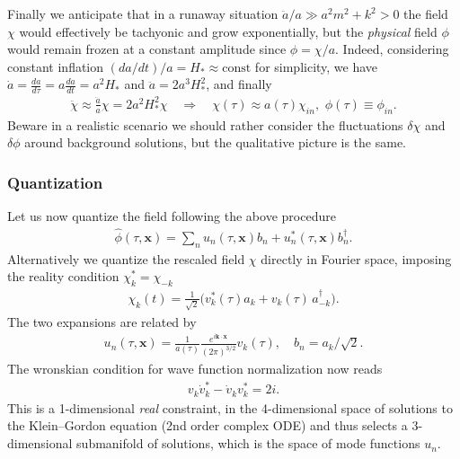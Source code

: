 \documentclass[../QFT_main.tex]{subfiles}
\begin{document}
Finally we anticipate that in a runaway situation $\ddot{a}/a\gg a^2m^2+k^2>0$ the field $\chi$ would effectively be tachyonic and grow exponentially, but the \emph{physical} field $\phi$ would remain frozen at a constant amplitude since $\phi=\chi/a$.
Indeed, considering constant inflation $(da/dt)/a=H_*\approx\mathrm{const}$ for simplicity, we have $\dot{a}=\frac{da}{d\tau}=a \frac{da}{dt}=a^2H_*$ and $\ddot{a} = 2 a^3 H_*^2$, and finally
\begin{align}
    \ddot{\chi} \approx \frac{\ddot{a}}{a}\chi = 2 a^2 H_*^2 \chi \quad \Rightarrow \quad \chi(\tau) \approx a(\tau)\chi_{in}, \,\, \phi(\tau)\equiv \phi_{in}.
\end{align}
Beware in a realistic scenario we should rather consider the fluctuations $\delta\chi$ and $\delta\phi$ around background solutions, but the qualitative picture is the same.



\subsubsection*{Quantization}

Let us now quantize the field following the above procedure
\begin{align}
    \hat{\phi}(\tau,\mathbf{x})=\sum_n u_n(\tau,\mathbf{x}) b_n + u_n^*(\tau,\mathbf{x}) b_n^\dagger.
\end{align}
Alternatively we quantize the rescaled field $\chi$ directly in Fourier space, imposing the reality condition $\chi_k^*=\chi_{-k}$ 
\begin{align}
    \chi_k(t)=\tfrac{1}{\sqrt{2}}\Big(v_k^*(\tau) a_k + v_k(\tau)\, a_{-k}^\dagger\Big).
\end{align}
The two expansions are related by
\begin{align}
    u_n(\tau,\mathbf{x}) = \frac{1}{a(\tau)} \frac{e^{i\mathbf{k}\cdot \mathbf{x}}}{(2\pi)^{3/2}} v_k(\tau), \quad b_n = a_k/\sqrt{2}.
\end{align}
The wronskian condition for wave function normalization now reads
\begin{align}
    v_k \dot{v}_k^* - \dot{v}_k v_k^* = 2i.
\end{align}
This is a 1-dimensional \emph{real} constraint, in the 4-dimensional space of solutions to the Klein--Gordon equation (2nd order complex ODE) and thus selects a 3-dimensional submanifold of solutions, which is the space of mode functions $u_n$.
\end{document}

